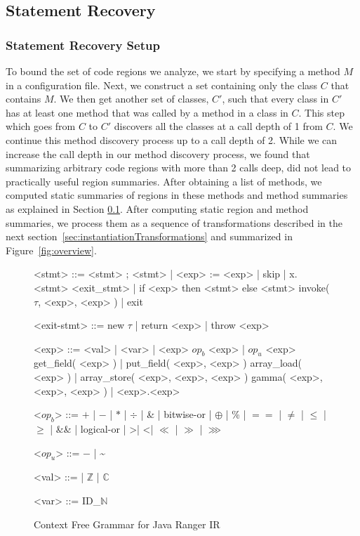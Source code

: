 \subsection{Statement Recovery}
\label{sec:static-analysis}

\subsubsection{Statement Recovery Setup}
%
To bound the set of code regions we analyze, we start by specifying a method $M$ in a configuration file.
%
Next, we construct a set containing only the class $C$ that contains $M$.
%
We then get another set of classes, $C'$,
such that every class in $C'$ has at least one method that was called by a method in a class in $C$.
%
This step which goes from $C$ to $C'$ discovers all the classes at a call depth of 1 from $C$.
%
We continue this method discovery process up to a call depth of 2.
%
While we can increase the call depth in our method discovery process, we found that summarizing
arbitrary code regions with more than 2 calls deep, did not lead to practically useful region summaries.
%
After obtaining a list of methods, we computed static summaries of regions in these methods and method summaries as
explained in Section \ref{sec:static-analysis}.
%
After computing static region and method summaries, we process them as a sequence of transformations described in the next section~\ref{sec:instantiationTransformations} and summarized
in Figure~\ref{fig:overview}.
%


\begin{figure}
\begin{grammar}
<stmt> ::= <stmt> ; <stmt> | <exp> := <exp> | skip | x.<stmt> 
\alt <exit_stmt> | if <exp> then <stmt> else <stmt> 
\alt invoke( $\tau$, <exp>, <exp> )  | exit

<exit-stmt> ::=  new $\tau$  | return <exp> |  throw <exp> 

<exp>  ::= <val> | <var> | <exp> $op_b$ <exp> | $op_u$ <exp>
\alt get_field( <exp> ) | put_field( <exp>, <exp> )
\alt array_load( <exp> ) | array_store( <exp>, <exp>, <exp> ) 
\alt gamma( <exp>, <exp>, <exp> ) | <exp>.<exp>

<$op_b$> ::= $+$ | $-$ | $*$ | $\div$ | \& | bitwise-or | $\oplus$ | \% | $==$ | $\neq$ | $\leq$ | $\geq$ | \&\& | logical-or | \textgreater | \textless | $\ll$ | $\gg$ | $\ggg$

<$op_u$> ::= $-$ | \textasciitilde

<val> ::= \unit | $\mathbb{Z}$ |  $\mathbb{C}$

<var> ::= ID_$\mathbb{N}$
\end{grammar}
\caption{Context Free Grammar for Java Ranger IR}
\label{fig:grammar}
\end{figure}


